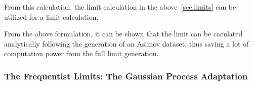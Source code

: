 From this calculation, the limit calculation in the above~\ref{sec:limits} can be utilized for a limit calculation. 

%
%
%



%
%


%


From the above formulation, it can be shown that the limit can be caculated analytically following the generation of an Asimov dataset, thus saving a lot of computation power from the full limit generation. 

\subsubsection{The Frequentist Limits: The Gaussian Process Adaptation}

